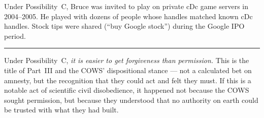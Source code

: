 Under Possibility~C, Bruce was invited to play on private cDc game servers in 2004--2005. He played with dozens of people whose handles matched known cDc handles. Stock tips were shared (``buy Google stock'') during the Google IPO period.

\vspace{1cm}\noindent\rule{0.5\textwidth}{0.5pt}\vspace{0.5cm}

Under Possibility~C, \textit{it is easier to get forgiveness than permission.} This is the title of Part~III and the COWS' dispositional stance --- not a calculated bet on amnesty, but the recognition that they could act and felt they must. If this is a notable act of scientific civil disobedience, it happened not because the COWS sought permission, but because they understood that no authority on earth could be trusted with what they had built.

\chapterreturn
